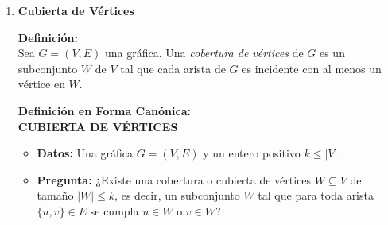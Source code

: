 \begin{enumerate}
    \textbf{Ejemplar concreto}\\
    \begin{itemize}
        \item \textbf{Entrada:} $(G, w)$, donde $G = (V, E)$ es un gráfica definida por:
            \begin{itemize}
                \item Conjunto de vértices: $V = \{A, B, C, D, E, F\}$
            \item Conjunto de aristas $E$ con su respectiva función de peso $w$
            \end{itemize}

        \[
        E = \{ (A,B), (A,C), (B,D), (C,D), (C,E), (D,F), (E,F) \}
        \]
        donde los pesos para cada arista son:
        \begin{align*}
        w(A,B) &= 3, \quad w(A,C) = 5, \quad w(B,D) = 2, \\
        w(C,D) &= 4, \quad w(C,E) = 6, \quad w(D,F) = 1, \quad w(E,F) = 3
        \end{align*}
        \item \textbf{Respuesta}: Si, Partición óptima: $S = \{A, D, E\}$ y $V \setminus S = \{B, C, F\}$, peso total máximo: $mc(G, w) = 3 + 5 + 2 + 4 + 6 + 1 + 3 = 24$ 
    \end{itemize}
    
    \textbf{Definición en Forma de Optimización:}\\ 
    CORTE MÁXIMO (MAX-CUT)
    \begin{itemize}
    \item \textbf{Datos:} Una gráfica $G = (V, E)$ y una función de pesos en sus aristas $w$, y una partición $S$ de $G$ y $V \setminus S$.
    \item \textbf{Pregunta:} ¿Cuál es la partición $(S, V \setminus S)$ del conjunto de vértices $V$ que maximiza el peso total del corte, es decir, que maximiza la expresión?:
    \[
    w(S, V \setminus S) = \sum_{i \in S, \, j \in V \setminus S} w(i, j) \quad 
    \]
\end{itemize}
        
    \item \textbf{Cubierta de Vértices} 
    
    \textbf{Definición:} \\
    Sea $G = (V, E)$ una gráfica. Una \emph{cobertura de vértices} de $G$ es un subconjunto $W$ de $V$ tal que cada arista de $G$ es incidente con al menos un vértice en $W$. 

    \textbf{Definición en Forma Canónica:}\\
    \textbf{CUBIERTA DE VÉRTICES}
    \begin{itemize}
    \item \textbf{Datos:} Una gráfica $G = (V, E)$ y un entero positivo $k \le |V|$.
    \item \textbf{Pregunta:} ¿Existe una cobertura o cubierta de vértices $W \subseteq V$ de tamaño $|W| \le k$, es decir, un subconjunto $W$ tal que para toda arista $\{u, v\} \in E$ se cumpla $u \in W$ o $v \in W$?
\end{itemize}


\end{enumerate}
